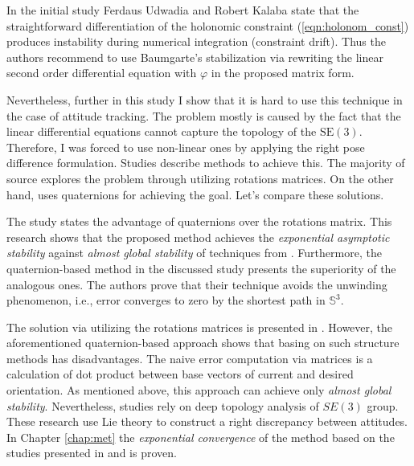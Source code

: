 In the initial study \cite{UdwadiaKalabaApproach} Ferdaus Udwadia and Robert
Kalaba state that the straightforward differentiation of the holonomic
constraint (\ref{eqn:holonom_const}) produces instability during numerical
integration (constraint drift). Thus the authors recommend to use
Baumgarte's stabilization \cite{BaumgarteStab} via rewriting the linear second
order differential equation with $\varphi$ in the proposed matrix form.

Nevertheless, further in this study I show that it is hard to use
this technique in the case of attitude tracking. The problem mostly
is caused by the fact that the linear differential equations cannot
capture the topology of the $\text{SE}(3)$. Therefore, I was forced
to use non-linear ones by applying the right pose difference formulation.
Studies \cite{SlidingOnManifoldsQuat,GeomControlQuadSE3,
RigidBodyAttCon,OutFeedbackStabForOrbRob,ANonlinearObserverUsingPose}
describe methods to achieve this. The majority \cite{GeomControlQuadSE3,
RigidBodyAttCon,OutFeedbackStabForOrbRob,ANonlinearObserverUsingPose} of
source explores the problem through utilizing rotations matrices. On the other hand, 
\cite{SlidingOnManifoldsQuat} uses quaternions for achieving the goal.
Let's compare these solutions.

The study \cite{SlidingOnManifoldsQuat} states the advantage of quaternions over 
the rotations matrix. This research shows that the proposed method achieves
the \emph{exponential asymptotic stability} against \emph{almost global
stability} of techniques from \cite{GeomControlQuadSE3,RigidBodyAttCon}.
Furthermore, the quaternion-based method in the discussed study 
\cite{SlidingOnManifoldsQuat} presents the superiority of the analogous ones. The 
authors prove that their technique avoids the unwinding phenomenon, i.e., error 
converges to zero by the shortest path in $\mathbb{S}^3$.

The solution via utilizing the rotations matrices is presented in
\cite{GeomControlQuadSE3,RigidBodyAttCon,OutFeedbackStabForOrbRob,
ANonlinearObserverUsingPose}. However, the aforementioned quaternion-based
approach shows that basing on such structure methods has disadvantages.
The naive error computation via matrices is a calculation of dot product
between base vectors of current and desired orientation. As mentioned
above, this approach can achieve only \emph{almost global stability}.
Nevertheless, studies \cite{OutFeedbackStabForOrbRob, ANonlinearObserverUsingPose}
rely on deep topology analysis of $SE(3)$ group. These research use 
Lie theory to construct a right discrepancy between attitudes. In
Chapter \ref{chap:met} the \emph{exponential convergence} of the method
based on the studies presented in \cite{OutFeedbackStabForOrbRob} and 
\cite{ANonlinearObserverUsingPose} is proven.

